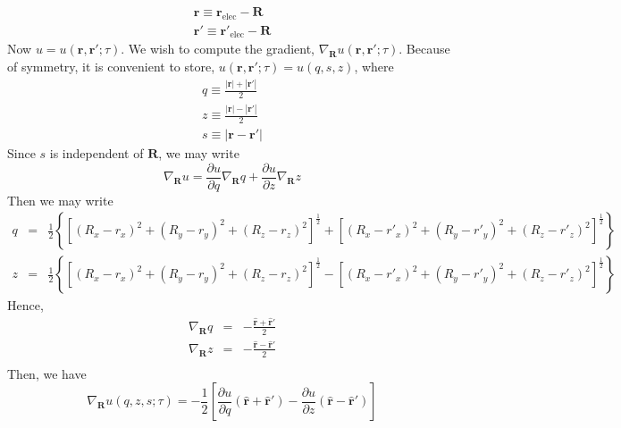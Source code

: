 \documentclass{article}
\newcommand{\vr}{\mathbf{r}}
\newcommand{\vrp}{\mathbf{r}'}
\newcommand{\vR}{\mathbf{R}}
\begin{document}
\begin{eqnarray}
\vr \equiv   \vr_\text{elec} - \vR \\
\vrp \equiv  \vrp_\text{elec} - \vR
\end{eqnarray}
Now $u = u(\vr,\vrp;\tau)$.  We wish to compute the gradient,
$\nabla_\vR u(\vr, \vrp; \tau)$.  Because of symmetry, it is
convenient to store, $u(\vr, \vrp;\tau) = u(q,s,z)$, where
\begin{eqnarray}
q \equiv \frac{|\vr| + |\vrp|}{2} \\
z \equiv \frac{|\vr| - |\vrp|}{2} \\
s \equiv |\vr - \vrp|
\end{eqnarray}
Since $s$ is independent of $\vR$, we may write
\begin{equation}
\nabla_\vR u = \frac{\partial u}{\partial q} \nabla_\vR q +
\frac{\partial u}{\partial z} \nabla_\vR z
\end{equation}
Then we may write
\begin{eqnarray}
q & = & \frac{1}{2} \left\{\left[ (R_x - r_x)^2 + (R_y - r_y)^2 +
  (R_z-r_z)^2\right]^{\frac{1}{2}}+ 
\left[(R_x-r'_x)^2 +(R_y-r'_y)^2 +
  (R_z-r'_z)^2\right]^\frac{1}{2}\right\} \\
z & = &\frac{1}{2} \left\{\left[ (R_x - r_x)^2 + (R_y - r_y)^2 +
  (R_z-r_z)^2\right]^{\frac{1}{2}}- 
\left[(R_x-r'_x)^2 +(R_y-r'_y)^2 +
  (R_z-r'_z)^2\right]^\frac{1}{2}\right\} 
\end{eqnarray}
Hence,
\begin{eqnarray}
  \nabla_\vR q & = & -\frac{\hat{\vr} + \hat{\vr}'}{2} \\
  \nabla_\vR z & = & -\frac{\hat{\vr} - \hat{\vr}'}{2} \\
\end{eqnarray}
Then, we have
\begin{equation}
\nabla_{\vR} u(q,z,s;\tau) = -\frac{1}{2}\left[\frac{\partial u}{\partial q}
\left(\hat{\vr} + \hat{\vr}'\right)
-\frac{\partial u}{\partial z} \left(\hat{\vr} -\hat{\vr}'\right) \right]
\end{equation}
\end{document}
